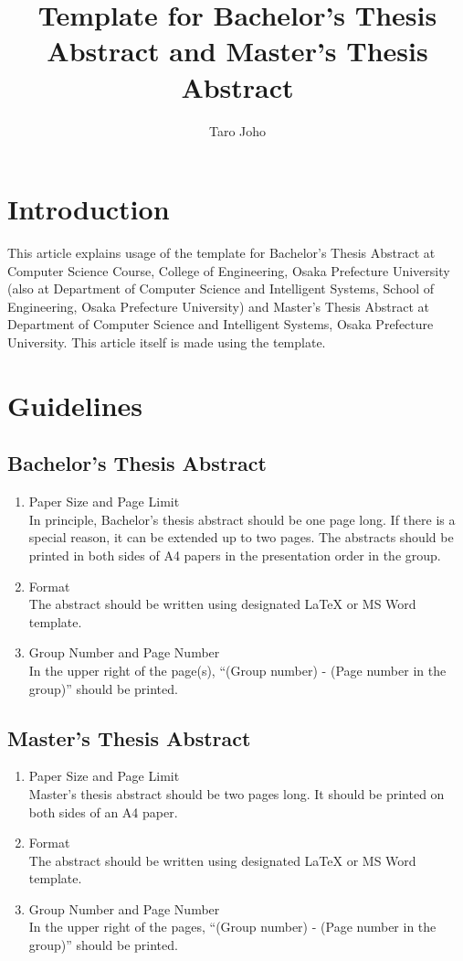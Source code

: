 \documentclass[a4paper,twoside,twocolumn,10pt]{article}
\title{Template for Bachelor's Thesis Abstract and Master's Thesis Abstract}
\author{Taro Joho}
\begin{document}
\maketitle %
\small

\section{Introduction}
This article explains usage of the
template for Bachelor's Thesis Abstract at Computer Science Course,
College of Engineering, Osaka Prefecture University
(also at Department of Computer Science and Intelligent Systems,
School of Engineering, Osaka Prefecture University)
and
Master's Thesis Abstract at Department of Computer Science and
Intelligent Systems, Osaka Prefecture University.
This article itself is made using the template.


\section{Guidelines}

\subsection{Bachelor's Thesis Abstract}
\begin{enumerate}
\item Paper Size and Page Limit\\
  In principle, Bachelor's thesis abstract should be one page long.
  If there is a special reason, it can be extended up to two pages.
  The abstracts should be printed in both sides of A4 papers
  in the presentation order in the group.
\item Format\\
  The abstract should be written using
  designated LaTeX or MS Word template.
\item Group Number and Page Number\\
  In the upper right of the page(s),
  ``(Group number) - (Page number in the group)''
  should be printed.
\end{enumerate}

\subsection{Master's Thesis Abstract}
\begin{enumerate}
\item Paper Size and Page Limit\\
  Master's thesis abstract should be two pages long.
  It should be printed on both sides of an A4 paper.
\item Format\\
  The abstract should be written using
  designated LaTeX or MS Word template.
\item Group Number and Page Number\\
  In the upper right of the pages,
  ``(Group number) - (Page number in the group)''
  should be printed.
\end{enumerate}
\end{document}

